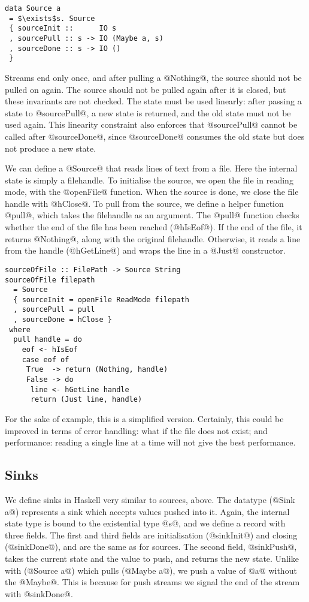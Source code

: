\begin{lstlisting}[mathescape=true]
data Source a
 = $\exists$s. Source
 { sourceInit ::      IO s
 , sourcePull :: s -> IO (Maybe a, s)
 , sourceDone :: s -> IO ()
 }
\end{lstlisting}

Streams end only once, and after pulling a @Nothing@, the source should not be pulled on again.
The source should not be pulled again after it is closed, but these invariants are not checked.
The state must be used linearly: after passing a state to @sourcePull@, a new state is returned, and the old state must not be used again.
This linearity constraint also enforces that @sourcePull@ cannot be called after @sourceDone@, since @sourceDone@ consumes the old state but does not produce a new state.

We can define a @Source@ that reads lines of text from a file.
Here the internal state is simply a filehandle.
To initialise the source, we open the file in reading mode, with the @openFile@ function.
When the source is done, we close the file handle with @hClose@.
To pull from the source, we define a helper function @pull@, which takes the filehandle as an argument.
The @pull@ function checks whether the end of the file has been reached (@hIsEof@).
If the end of the file, it returns @Nothing@, along with the original filehandle.
Otherwise, it reads a line from the handle (@hGetLine@) and wraps the line in a @Just@ constructor.

\begin{lstlisting}
sourceOfFile :: FilePath -> Source String
sourceOfFile filepath
  = Source
  { sourceInit = openFile ReadMode filepath
  , sourcePull = pull
  , sourceDone = hClose }
 where
  pull handle = do
    eof <- hIsEof
    case eof of
     True  -> return (Nothing, handle)
     False -> do
      line <- hGetLine handle
      return (Just line, handle)
\end{lstlisting}

For the sake of example, this is a simplified version.
Certainly, this could be improved in terms of error handling: what if the file does not exist; and performance: reading a single line at a time will not give the best performance.

\subsection{Sinks}

We define sinks in Haskell very similar to sources, above.
The datatype (@Sink a@) represents a sink which accepts values pushed into it.
Again, the internal state type is bound to the existential type @s@, and we define a record with three fields.
The first and third fields are initialisation (@sinkInit@) and closing (@sinkDone@), and are the same as for sources.
The second field, @sinkPush@, takes the current state and the value to push, and returns the new state.
Unlike with (@Source a@) which pulls (@Maybe a@), we push a value of @a@ without the @Maybe@.
This is because for push streams we signal the end of the stream with @sinkDone@.


